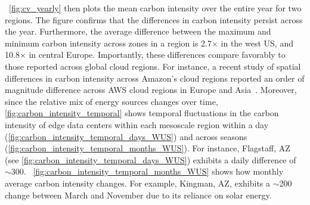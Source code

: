 ~\autoref{fig:cv_yearly} then plots the mean carbon intensity over the entire year for two regions. The figure confirms that the differences in carbon intensity persist across the year. Furthermore, the average difference between the maximum and minimum carbon intensity across zones in a region is %
2.7$\times$ in the west US, %
and 10.8$\times$ in central Europe. Importantly, these differences compare favorably to those reported across global cloud regions. For instance, a recent study of spatial differences in carbon intensity across Amazon's cloud regions reported an order of magnitude difference across AWS cloud regions in Europe and Asia~\cite{sukprasert2024limitations}.
Moreover, since the relative mix of energy sources changes over time, \autoref{fig:carbon_intensity_temporal} shows temporal fluctuations in the carbon intensity of edge data centers within each mesoscale region within a day (\autoref{fig:carbon_intensity_temporal_days_WUS}) %
and across seasons (\autoref{fig:carbon_intensity_temporal_months_WUS}). %
For instance, Flagstaff, AZ (see \autoref{fig:carbon_intensity_temporal_days_WUS}) exhibits a daily difference of $\sim$300\carbonunit.
~\autoref{fig:carbon_intensity_temporal_months_WUS} shows how monthly average carbon intensity changes.
For example, Kingman, AZ, exhibits a $\sim$200 \carbonunit change between March and November due to its reliance on solar energy. %

